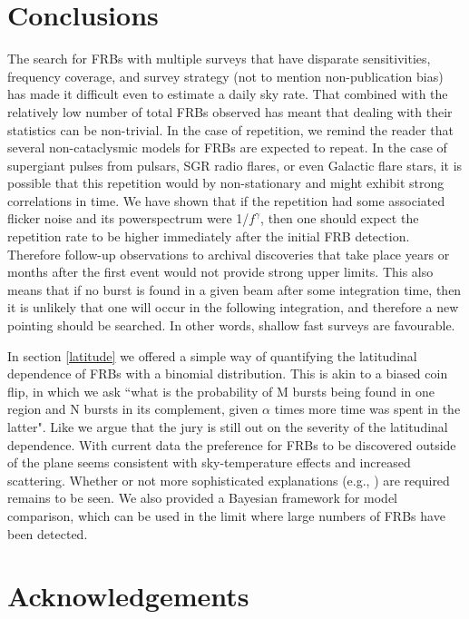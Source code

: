\documentclass[useAMS,usenatbib]{mn2e}
\begin{document}
\section{Conclusions}

The search for FRBs with multiple surveys that have disparate sensitivities, 
frequency coverage, and survey strategy (not to mention non-publication bias) 
has made it difficult even to 
estimate a daily sky rate. 
That combined with the relatively low number of total FRBs observed 
has meant that dealing with their statistics can be non-trivial. In 
the case of repetition, we remind the reader that several non-cataclysmic 
models for FRBs are expected to repeat. In the case of supergiant 
pulses from pulsars, SGR radio flares, or even Galactic flare stars, it is possible 
that this repetition would by non-stationary and might exhibit strong correlations 
in time. We have shown that if the repetition had some associated flicker noise 
and its powerspectrum were 1/$f^\gamma$, then one should expect the repetition 
rate to be higher immediately after the initial FRB detection. Therefore follow-up 
observations to archival discoveries that take place years or 
months after the first event would not provide strong upper limits. 
This also means that if no burst is found in a given beam after some 
integration time, then it is unlikely that one will occur in the following integration, and therefore 
a new pointing should be searched. In other words, shallow fast surveys are favourable. 

In section \ref{latitude} we offered a simple way of quantifying the 
latitudinal dependence of FRBs with a binomial distribution. This 
is akin to a biased coin flip, in which we ask ``what is the probability of 
M bursts being found in one region and N bursts in its complement, given 
$\alpha$ times more time was spent in the latter". Like \cite{2015arXiv150500834R} we argue
that the jury is still out on the severity of the latitudinal 
dependence. With current data the preference for FRBs to 
be discovered outside of the plane seems consistent with
sky-temperature effects and increased scattering. 
Whether or not more sophisticated explanations 
(e.g., \citealt{2015MNRAS.451.3278M}) are required remains to be seen. 
We also provided a Bayesian framework for model comparison,
which can be used in the limit where large numbers of FRBs have
been detected. 

\section{Acknowledgements}
\end{document}

